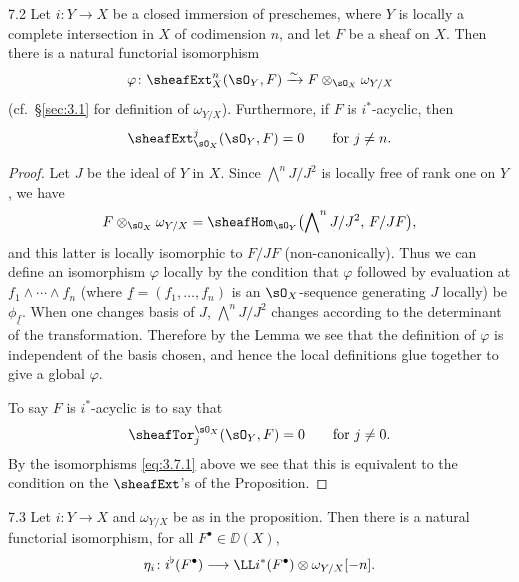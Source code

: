 \begin{bookproposition}{7.2}\label{prop:3.7.2}
Let $i\colon Y\to X$ be a closed immersion of preschemes, where $Y$ is locally a complete intersection in $X$ of codimension $n$, and let $F$ be a sheaf on $X$. Then there is a natural functorial isomorphism
\[
\varphi \colon \sheafExt^n_X(\sO_Y, F) \xrightarrow{\sim} F\otimes_{\sO_X}\omega_{Y/X}
\]
(cf.\ \S\ref{sec:3.1} for definition of $\omega_{Y/X}$). Furthermore, if $F$ is $i^*$-acyclic, then
\[
\sheafExt_{\sO_X}^j(\sO_Y, F)=0 \qquad \text{for } j\neq n.
\]
\end{bookproposition}

\begin{proof}
Let $J$ be the ideal of $Y$ in $X$. Since $\bigwedge^n J/J^2$ is locally free of rank one on $Y$, we have
\[
F\otimes_{\sO_X}\omega_{Y/X} = \sheafHom_{\sO_Y}\bigl(\bigwedge\nolimits^n J/J^2,\, F/JF\bigr),
\]
and this latter is locally isomorphic to $F/JF$ (non-canonically). Thus we can define an isomorphism $\varphi$ locally by the condition that $\varphi$ followed by evaluation at $f_1\wedge\cdots\wedge f_n$ (where $\underline{f}=(f_1,\dots,f_n)$ is an $\sO_X$-sequence generating $J$ locally) be $\phi_{\underline{f}}$. When one changes basis of $J$, $\bigwedge^n J/J^2$ changes according to the determinant of the transformation. Therefore by the Lemma we see that the definition of $\varphi$ is independent of the basis chosen, and hence the local definitions glue together to give a global $\varphi$.

To say $F$ is $i^*$-acyclic is to say that
\[
\sheafTor_j^{\sO_X}(\sO_Y,F) = 0 \qquad \text{for } j\neq 0.
\]
By the isomorphisms \eqref{eq:3.7.1} above we see that this is equivalent to the condition on the $\sheafExt$'s of the Proposition.
\end{proof}

\begin{bookcorollary}{7.3}\label{cor:3.7.3}
Let $i\colon Y\to X$ and $\omega_{Y/X}$ be as in the proposition. Then there is a natural functorial isomorphism, for all $F^\bullet\in\DD(X)$,
\[
\eta_i \colon i^{\flat}(F^\bullet) \longrightarrow \LL i^*(F^\bullet)\otimes\omega_{Y/X}[-n].
\]
\end{bookcorollary}

